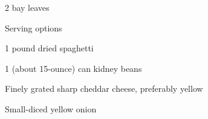 \documentclass[../cookbook]{subfiles}
\begin{document}
{\begin{minipage}[t]{\the\dimexpr0.35\textwidth}
\begin{jitem}
\begin{jsubitem}
                \item 2 bay leaves
                \end{jsubitem}
            \item Serving options
                \begin{jsubitem}
                \item 1 pound dried spaghetti
                \item 1 (about 15-ounce) can kidney beans
                \item Finely grated sharp cheddar cheese, preferably yellow
                \item Small-diced yellow onion
                \end{jsubitem}
            \end{jitem}
        \end{minipage}
    }
\end{document}
